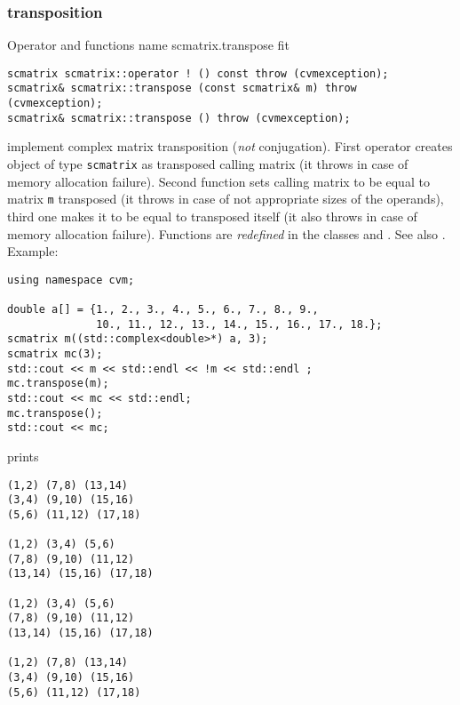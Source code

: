 \subsubsection{transposition}
Operator and functions%
\pdfdest name {scmatrix.transpose} fit
\begin{verbatim}
scmatrix scmatrix::operator ! () const throw (cvmexception);
scmatrix& scmatrix::transpose (const scmatrix& m) throw (cvmexception);
scmatrix& scmatrix::transpose () throw (cvmexception);
\end{verbatim}
implement complex matrix transposition (\emph{not} conjugation).
First operator creates  object of type \verb"scmatrix" as
 transposed calling matrix
(it throws  
in case of memory allocation failure). 
Second function sets  calling matrix to be equal to  matrix
\verb"m" transposed
(it throws  
in case of not appropriate sizes of the operands), 
third one makes it to be equal to
transposed itself (it also throws  
in case of memory allocation failure). 
Functions are \emph{redefined} in the classes
and .
See also .
Example:
\begin{Verbatim}
using namespace cvm;

double a[] = {1., 2., 3., 4., 5., 6., 7., 8., 9.,
              10., 11., 12., 13., 14., 15., 16., 17., 18.};
scmatrix m((std::complex<double>*) a, 3);
scmatrix mc(3);
std::cout << m << std::endl << !m << std::endl ;
mc.transpose(m);
std::cout << mc << std::endl;
mc.transpose();
std::cout << mc;
\end{Verbatim}
prints
\begin{Verbatim}
(1,2) (7,8) (13,14)
(3,4) (9,10) (15,16)
(5,6) (11,12) (17,18)

(1,2) (3,4) (5,6)
(7,8) (9,10) (11,12)
(13,14) (15,16) (17,18)

(1,2) (3,4) (5,6)
(7,8) (9,10) (11,12)
(13,14) (15,16) (17,18)

(1,2) (7,8) (13,14)
(3,4) (9,10) (15,16)
(5,6) (11,12) (17,18)
\end{Verbatim}
\newpage







